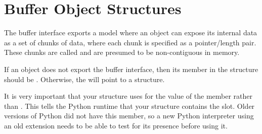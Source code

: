 \documentclass{manual}
\begin{document}
\section{Buffer Object Structures \label{buffer-structs}}

The buffer interface exports a model where an object can expose its
internal data as a set of chunks of data, where each chunk is
specified as a pointer/length pair.  These chunks are called
 and are presumed to be non-contiguous in memory.

If an object does not export the buffer interface, then its
 member in the  structure
should be \NULL{}.  Otherwise, the  will point to
a  structure.

 It is very important that your
 structure uses  for
the value of the  member rather than .  This
tells the Python runtime that your  structure
contains the  slot. Older versions of Python
did not have this member, so a new Python interpreter using an old
extension needs to be able to test for its presence before using it.
\end{document}
